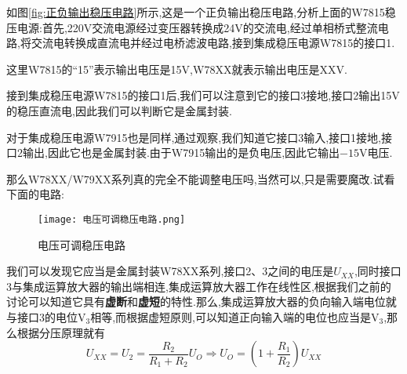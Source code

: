 \Par 如图\ref{fig:正负输出稳压电路}所示,这是一个正负输出稳压电路,分析上面的W7815稳压电源:首先,220V交流电源经过变压器转换成24V的交流电,经过单相桥式整流电路,将交流电转换成直流电并经过电桥滤波电路,接到集成稳压电源W7815的接口1.

\Par 这里W7815的“15”表示输出电压是15V,W78XX就表示输出电压是XXV.

\Par 接到集成稳压电源W7815的接口1后,我们可以注意到它的接口3接地,接口2输出15V的稳压直流电,因此我们可以判断它是金属封装.

\Par 对于集成稳压电源W7915也是同样,通过观察,我们知道它接口3输入,接口1接地,接口2输出,因此它也是金属封装.由于W7915输出的是负电压,因此它输出$-15$V电压.

\Par 那么W78XX/W79XX系列真的完全不能调整电压吗,当然可以,只是需要魔改.试看下面的电路:
\begin{figure}[htbp]
	\centering
	\texttt{[image: 电压可调稳压电路.png]}
	\caption{电压可调稳压电路}
	\label{fig:电压可调稳压电路}
\end{figure}

我们可以发现它应当是金属封装W78XX系列,接口2、3之间的电压是$U_{XX}$,同时接口3与集成运算放大器的输出端相连,集成运算放大器工作在线性区,根据我们之前的讨论可以知道它具有\textbf{虚断}和\textbf{虚短}的特性.那么,集成运算放大器的负向输入端电位就与接口3的电位V$_3$相等,而根据虚短原则,可以知道正向输入端的电位也应当是V$_3$,那么根据分压原理就有
\begin{equation}
    U_{XX}=U_2=\frac{R_2}{R_1+R_2}U_O\Longrightarrow U_O=\left( 1+\frac{R_1}{R_2} \right) U_{XX}
\end{equation}